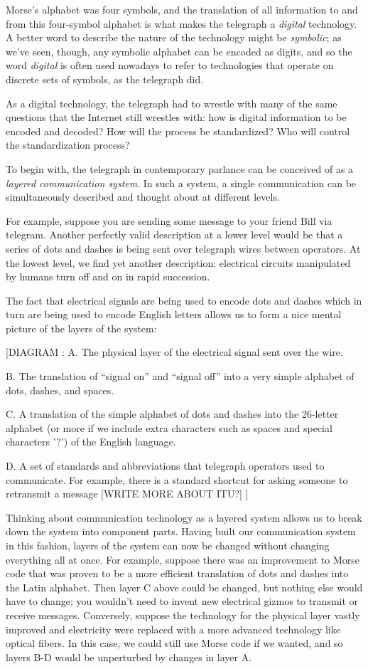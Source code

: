 \documentclass[UTF8]{book}
\begin{document}
\begin{CJK}{UTF8}{gbsn}
Morse's alphabet was four symbols, and the translation of all information to and from this four-symbol alphabet is what makes the telegraph a \emph{digital} technology. A better word to describe the nature of the technology might be \emph{symbolic}; as we've seen, though, any symbolic alphabet can be encoded as digits, and so the word \emph{digital} is often used nowadays to refer to technologies that operate on discrete sets of symbols, as the telegraph did.

As a digital technology, the telegraph had to wrestle with many of the same questions that the Internet still wrestles with: how is digital information to be encoded and decoded? How will the process be standardized? Who will control the standardization process?

To begin with, the telegraph in contemporary parlance can be conceived of as a \emph{layered communication system}. In such a system, a single communication can be simultaneously described and thought about at different levels.

For example, suppose you are sending some message to your friend Bill via telegram. Another perfectly valid description at a lower level would be that a series of dots and dashes is being sent over telegraph wires between operators. At the lowest level, we find yet another description: electrical circuits manipulated by humans turn off and on in rapid succession.

The fact that electrical signals are being used to encode dots and dashes which in turn are being used to encode English letters allows us to form a nice mental picture of the layers of the system:

[DIAGRAM :
A. The physical layer of the electrical signal sent over the wire.

B. The translation of “signal on” and “signal off” into a very simple alphabet of dots, dashes, and spaces.

C. A translation of the simple alphabet of dots and dashes into the 26-letter alphabet (or more if we include extra characters such as spaces and special characters '?') of the English language.

D. A set of standards and abbreviations that telegraph operators used to communicate. For example, there is a standard shortcut for asking someone to retransmit a message [WRITE MORE ABOUT ITU?]
]

Thinking about communication technology as a layered system allows us to break down the system into component parts. Having built our communication system in this fashion, layers of the system can now be changed without changing everything all at once. For example, suppose there was an improvement to Morse code that was proven to be a more efficient translation of dots and dashes into the Latin alphabet. Then layer C above could be changed, but nothing else would have to change; you wouldn't need to invent new electrical gizmos to transmit or receive messages. Conversely, suppose the technology for the physical layer vastly improved and electricity were replaced with a more advanced technology like optical fibers. In this case, we could still use Morse code if we wanted, and so layers B-D would be unperturbed by changes in layer A.


\end{CJK}
\end{document}
